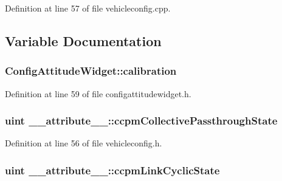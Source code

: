 \-Definition at line 57 of file vehicleconfig.\-cpp.



\subsection{\-Variable \-Documentation}
\hypertarget{group___config_plugin_ga4b85d588b6292a6f8755725ccca770fb}{
\subsubsection[{calibration}]{ {\bf \-Config\-Attitude\-Widget\-::calibration}}}\label{group___config_plugin_ga4b85d588b6292a6f8755725ccca770fb}


\-Definition at line 59 of file configattitudewidget.\-h.

\hypertarget{group___config_plugin_ga14bffa0ebae107df7ec9a9b6e06294a9}{
\subsubsection[{ccpm\-Collective\-Passthrough\-State}]{\setlength{\rightskip}{0pt plus 5cm}uint {\bf \-\_\-\-\_\-attribute\-\_\-\-\_\-\-::ccpm\-Collective\-Passthrough\-State}}}\label{group___config_plugin_ga14bffa0ebae107df7ec9a9b6e06294a9}


\-Definition at line 56 of file vehicleconfig.\-h.

\hypertarget{group___config_plugin_ga31785760b6dab4f2006d4824ef4b7e5b}{
\subsubsection[{ccpm\-Link\-Cyclic\-State}]{\setlength{\rightskip}{0pt plus 5cm}uint {\bf \-\_\-\-\_\-attribute\-\_\-\-\_\-\-::ccpm\-Link\-Cyclic\-State}}}\label{group___config_plugin_ga31785760b6dab4f2006d4824ef4b7e5b}


